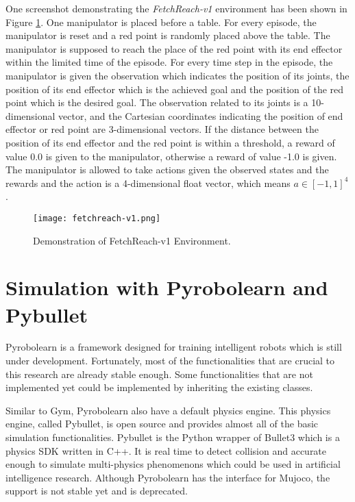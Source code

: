 \documentclass[a4paper, 12pt]{report}
\begin{document}
    One screenshot demonstrating the \emph{FetchReach-v1} environment has been shown in Figure \ref{fetchreach-v1}. One manipulator is placed before a table. For every episode, the manipulator is reset and a red point is randomly placed above the table. The manipulator is supposed to reach the place of the red point with its end effector within the limited time of the episode. For every time step in the episode, the manipulator is given the observation which indicates the position of its joints, the position of its end effector which is the achieved goal and the position of the red point which is the desired goal. The observation related to its joints is a 10-dimensional vector, and the Cartesian coordinates indicating the position of end effector or red point are 3-dimensional vectors. If the distance between the position of its end effector and the red point is within a threshold, a reward of value 0.0 is given to the manipulator, otherwise a reward of value -1.0 is given. The manipulator is allowed to take actions given the observed states and the rewards and the action is a 4-dimensional float vector, which means $a\in [-1,1]^4$.
    \begin{figure}
        \centering
        \texttt{[image: fetchreach-v1.png]}
        \caption{Demonstration of FetchReach-v1 Environment.}
        \label{fetchreach-v1}
    \end{figure}


    \section {Simulation with Pyrobolearn and Pybullet}

    Pyrobolearn\cite{delhaisse2019pyrobolearn} is a framework designed for training intelligent robots which is still under development. Fortunately, most of the functionalities that are crucial to this research are already stable enough. Some functionalities that are not implemented yet could be implemented by inheriting the existing classes.

    Similar to Gym, Pyrobolearn also have a default physics engine. This physics engine, called Pybullet\cite{coumans2019}, is open source and provides almost all of the basic simulation functionalities. Pybullet is the Python wrapper of Bullet3 which is a physics SDK written in C++. It is real time to detect collision and accurate enough to simulate multi-physics phenomenons which could be used in artificial intelligence research. Although Pyrobolearn has the interface for Mujoco, the support is not stable yet and is deprecated.
\end{document}
